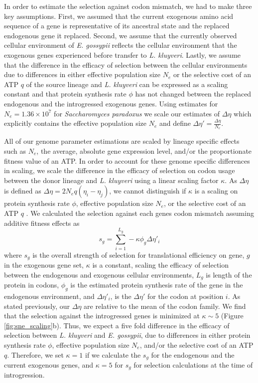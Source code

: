 \documentclass[doublespacing,linenumbers]{bmcart}
\newcommand{\kluyveri}{\textit{L. kluyveri}\xspace}
\newcommand{\gossypii}{\textit{E. gossypii}\xspace}
\newcommand{\DE}{\ensuremath{{\Delta \eta}}\xspace}
\newcommand{\Ne}{\ensuremath{N_e}\xspace}
\begin{document}
In order to estimate the selection against codon mismatch, we had to make three key assumptions.
First, we assumed that the current exogenous amino acid sequence of a gene is representative of its ancestral state and the replaced endogenous gene it replaced.
Second, we assume that the currently observed cellular environment of \gossypii reflects the cellular environment that the exogenous genes experienced before transfer to \kluyveri.
Lastly, we assume that the difference in the efficacy of selection between the cellular environments due to differences in either effective population size $\Ne$ or the selective cost of an ATP $q$ of the source lineage and \kluyveri can be expressed as a scaling constant and that protein synthesis rate $\phi$ has not changed between the replaced endogenous and the introgressed exogenous genes.
Using estimates for $\Ne = 1.36\times10^7$ \citep{wagner2005} for \textit{Saccharomyces paradoxus} we scale our estimates of \DE which explicitly contains the effective population size $\Ne$ \citep{gilchrist2015} and define $\DE' = \frac{\DE}{\Ne}$.

All of our genome parameter estimations are scaled by lineage specific effects such as \Ne, the average, absolute gene expression level, and/or the proportionate fitness value of an ATP.
In order to account for these genome specific differences in scaling, we scale the difference in the efficacy of selection on codon usage between the donor lineage and \kluyveri using a linear scaling factor $\kappa$.
As \DE is defined as $\DE = 2\Ne q(\eta_i-\eta_j)$, we cannot distinguish if $\kappa$ is a scaling on protein synthesis rate $\phi$, effective population size $\Ne$, or the selective cost of an ATP $q$ \citep{gilchrist2007, gilchrist2015}.
We calculated the selection against each genes codon mismatch assuming additive fitness effects as 
\begin{equation}
s_g = \sum_{i=1}^{L_g} -\kappa \phi_g \DE'_i
\label{equ:sg}
\end{equation}
where $s_g$ is the overall strength of selection for translational efficiency on gene, $g$  in the exogenous gene set, $\kappa$ is a constant, scaling the efficacy of selection between the endogenous and exogenous cellular environments, $L_{g}$ is length of the protein in codons, $\phi_g$ is the estimated protein synthesis rate of the gene in the endogenous environment, and $\DE'_i$, is the $\DE'$ for the codon at position $i$.
As stated previously, our \DE are relative to the mean of the codon family.
We find that the selection against the introgressed genes is minimized at $\kappa \sim 5$ (Figure \ref{fig:sne_scaling}b).
Thus, we expect a five fold difference in the efficacy of selection between \kluyveri and \gossypii, due to differences in either protein synthesis rate $\phi$, effective population size $\Ne$, and/or the selective cost of an ATP $q$.
Therefore, we set $\kappa = 1$ if we calculate the $s_g$ for the endogenous and the current exogenous genes, and $\kappa = 5$ for $s_g$ for selection calculations at the time of introgression.
\end{document}
